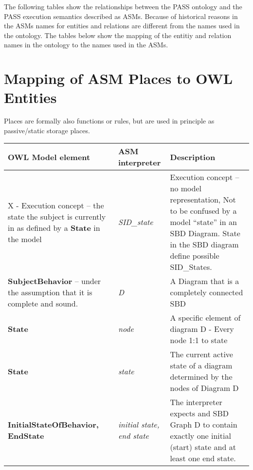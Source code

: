 The following tables show the relationships between the PASS ontology and the PASS execution semantics described as ASMs. Because of historical reasons in the ASMs names for entities and relations are different from the names used in the ontology. The tables below show the mapping of the entitiy and relation names in the ontology to the names used in the ASMs.

\section{Mapping of ASM Places to OWL Entities}
Places are formally also functions or rules, but are used in principle as passive/static storage places.

\footnotesize

\begin{landscape}
	\begin {longtable} {| p{} | p{} | p{}|}
	\hline
	OWL Model element &   ASM interpreter & Description\\
	\toprule
	\endhead
	\hline
	
	X - Execution concept – the state the subject is currently in as defined by a \textbf{State} in the model 
	& \textit{SID\_state} 
	&  Execution concept – no model representation, Not to be confused by a model “state” in an SBD Diagram. State in the SBD diagram define possible SID\_States.
	\\
	\hline
	
	\textbf{SubjectBehavior }	– under the assumption that it is complete and sound.
	& \textit{D} 
	&  A Diagram that is a completely connected SBD
	\\
	\hline
	
	\textbf{State}
	& \textit{node} 
	&  A specific element of diagram D -	Every node 1:1 to state
	\\
	\hline
	
	\textbf{State}
	& \textit{state} 
	& The current active state of a diagram determined by the nodes of Diagram D
	\\
	\hline
	
	\textbf{InitialStateOfBehavior, \newline EndState }
	& \textit{initial state, \newline end state} 
	& The interpreter expects and SBD Graph D to contain exactly one initial (start) state and at least one end state.
	\\
	\hline
	

\end{longtable}
\end{landscape}
